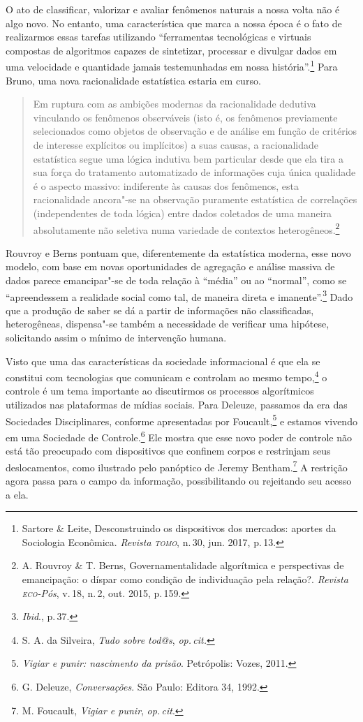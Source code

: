 O ato de classificar, valorizar e avaliar fenômenos naturais a nossa
volta não é algo novo. No entanto, uma característica que marca a nossa
época é o fato de realizarmos essas tarefas utilizando ``ferramentas
tecnológicas e virtuais compostas de algoritmos capazes de sintetizar,
processar e divulgar dados em uma velocidade e quantidade jamais
testemunhadas em nossa história''.\footnote{Sartore \& Leite,
Desconstruindo os dispositivos dos mercados: aportes da Sociologia Econômica. \textit{Revista \textsc{tomo}}, n.\,30, jun. 2017, p.\,13.} Para Bruno, uma nova racionalidade estatística estaria em curso.

\begin{quote}
Em ruptura com as ambições modernas da racionalidade dedutiva vinculando
os fenômenos observáveis (isto é, os fenômenos previamente selecionados
como objetos de observação e de análise em função de critérios de
interesse explícitos ou implícitos) a suas causas, a racionalidade
estatística segue uma lógica indutiva bem particular desde que ela tira
a sua força do tratamento automatizado de informações cuja única
qualidade é o aspecto massivo: indiferente às causas dos fenômenos, esta
racionalidade ancora"-se na observação puramente estatística de
correlações (independentes de toda lógica) entre dados coletados de uma
maneira absolutamente não seletiva numa variedade de contextos
heterogêneos.\footnote{A. Rouvroy \& T. Berns, 
Governamentalidade algorítmica e perspectivas de emancipação: o díspar como condição de
individuação pela relação?. \textit{Revista \textsc{eco}-Pós}, v.\,18, n.\,2, out. 2015,
p.\,159.}
\end{quote}

Rouvroy e Berns pontuam que, diferentemente da estatística
moderna, esse novo modelo, com base em novas oportunidades de agregação
e análise massiva de dados parece emancipar"-se de toda relação à
``média'' ou ao ``normal'', como se ``apreendessem a realidade social
como tal, de maneira direta e imanente''.\footnote{\textit{Ibid}., p.\,37.} Dado que a produção
de saber se dá a partir de informações não classificadas, heterogêneas,
dispensa"-se também a necessidade de verificar uma hipótese, solicitando
assim o mínimo de intervenção humana.

Visto que uma das características da sociedade informacional é que ela
se constitui com tecnologias que comunicam e controlam ao mesmo tempo,\footnote{S. A. da Silveira, \textit{Tudo sobre tod@s}, \textit{op.\,cit.}}
o controle é um tema importante ao discutirmos os
processos algorítmicos utilizados nas plataformas de mídias sociais.
Para Deleuze, passamos da era das Sociedades Disciplinares,
conforme apresentadas por Foucault,\footnote{\textit{Vigiar e punir: nascimento da prisão}. Petrópolis: Vozes, 2011.} e estamos vivendo em uma Sociedade de Controle.\footnote{G. Deleuze, \textit{Conversações}. São Paulo: Editora 34, 1992.} Ele mostra que esse novo poder de controle não está tão
preocupado com dispositivos que confinem corpos e restrinjam seus
deslocamentos, como ilustrado pelo panóptico de Jeremy Bentham.\footnote{M. Foucault, \textit{Vigiar e punir}, \textit{op.\,cit}.}
A restrição agora passa para o campo da informação, possibilitando ou rejeitando seu acesso a ela.

